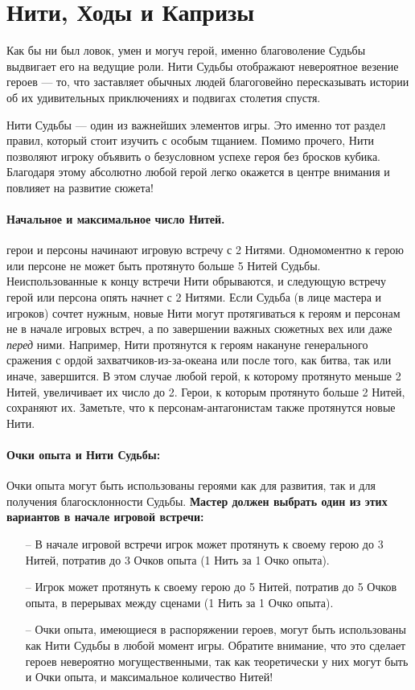 \section{Нити, Ходы и Капризы}
Как бы ни был ловок, умен и могуч герой, именно благоволение Судьбы выдвигает его на ведущие роли. Нити Судьбы отображают невероятное везение героев — то, что заставляет обычных людей благоговейно пересказывать истории об их удивительных приключениях и подвигах столетия спустя.
\begin{tcolorbox}
Нити Судьбы — один из важнейших элементов игры. Это именно тот раздел правил, который стоит изучить с особым тщанием. Помимо прочего, Нити позволяют игроку объявить о безусловном успехе героя без бросков кубика. Благодаря этому абсолютно любой герой легко окажется в центре внимания и повлияет на развитие сюжета!
\end{tcolorbox}
\paragraph{Начальное и максимальное число Нитей.} герои и персоны начинают игровую встречу с 2 Нитями. Одномоментно к герою или персоне не может быть протянуто больше 5 Нитей Судьбы. Неиспользованные к концу встречи Нити обрываются, и следующую встречу герой или персона опять начнет с 2 Нитями.
\newline
Если Судьба (в лице мастера и игроков) сочтет нужным, новые Нити могут протягиваться к героям и персонам не в начале игровых встреч, а по завершении важных сюжетных вех или даже \textit{перед} ними. Например, Нити протянутся к героям накануне генерального сражения с ордой захватчиков-из-за-океана или после того, как битва, так или иначе, завершится. В этом случае любой герой, к которому протянуто меньше 2 Нитей, увеличивает их число до 2. Герои, к которым протянуто больше 2 Нитей, сохраняют их. Заметьте, что к персонам-антагонистам также протянутся новые Нити.
\paragraph{Очки опыта и Нити Судьбы:} Очки опыта могут быть использованы героями как для развития, так и для получения благосклонности Судьбы. \textbf{Мастер должен выбрать один из этих вариантов в начале игровой встречи:}
\begin{itemize}
\item[--] В начале игровой встречи игрок может протянуть к своему герою до 3 Нитей, потратив до 3 Очков опыта (1 Нить за 1 Очко опыта).
\item[--] Игрок может протянуть к своему герою до 5 Нитей, потратив до 5 Очков опыта, в перерывах между сценами (1 Нить за 1 Очко опыта).
\item[--] Очки опыта, имеющиеся в распоряжении героев, могут быть использованы как Нити Судьбы в любой момент игры. Обратите внимание, что это сделает героев невероятно могущественными, так как теоретически у них могут быть и Очки опыта, и максимальное количество Нитей!
\end{itemize}

